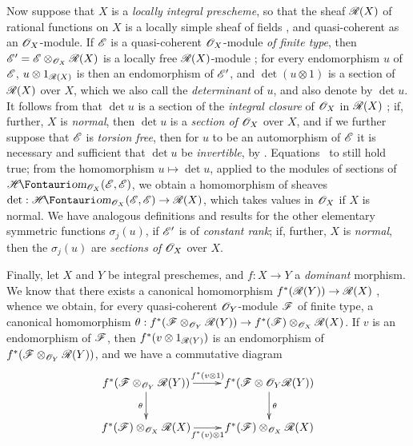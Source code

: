\begin{env}[6.4.9]
Now suppose that $X$ is a \emph{locally integral prescheme}, so that the sheaf $\mathscr{R}(X)$ of rational functions on $X$ is a locally simple sheaf of fields , and quasi-coherent as an $\mathscr{O}_X$-module.
If $\mathscr{E}$ is a quasi-coherent $\mathscr{O}_X$-module \emph{of finite type}, then $\mathscr{E}'=\mathscr{E}\otimes_{\mathscr{O}_X}\mathscr{R}(X)$ is a locally free $\mathscr{R}(X)$-module ;
for every endomorphism $u$ of $\mathscr{E}$, $u\otimes1_{\mathscr{R}(X)}$ is then an endomorphism of $\mathscr{E}'$, and $\det(u\otimes1)$ is a section of $\mathscr{R}(X)$ over $X$, which we also call the \emph{determinant} of $u$, and also denote by $\det u$.
It follows from  that $\det u$ is a section of the \emph{integral closure} of $\mathscr{O}_X$ in $\mathscr{R}(X)$ ;
if, further, $X$ is \emph{normal}, then $\det u$ is a \emph{section of $\mathscr{O}_X$} over $X$, and if we further suppose that $\mathscr{E}$ is \emph{torsion free}, then for $u$ to be an automorphism of $\mathscr{E}$ it is necessary and sufficient that $\det u$ be \emph{invertible}, by .
Equations~ to  still hold true;
from the homomorphism $u\mapsto\det u$, applied to the modules of sections of $\shHom_{\sh{O}_X}(\sh{E},\sh{E})$, we obtain a homomorphism of sheaves $\det:\shHom_{\sh{O}_X}(\sh{E},\sh{E})\to\sh{R}(X)$, which takes values in $\mathscr{O}_X$ if $X$ is normal.
We have analogous definitions and results for the other elementary symmetric functions $\sigma_j(u)$, if $\mathscr{E}'$ is of \emph{constant rank};
if, further, $X$ is \emph{normal}, then the $\sigma_j(u)$ are \emph{sections of $\mathscr{O}_X$} over $X$.

Finally, let $X$ and $Y$ be integral preschemes, and $f:X\to Y$ a \emph{dominant} morphism.
We know that there exists a canonical homomorphism $f^*(\sh{R}(Y))\to\sh{R}(X)$ , whence we obtain, for every quasi-coherent $\mathscr{O}_Y$-module $\mathscr{F}$ of finite type, a canonical homomorphism $\theta:f^*(\sh{F}\otimes_{\sh{O}_Y}\sh{R}(Y))\to f^*(\sh{F})\otimes_{\sh{O}_X}\sh{R}(X)$.
If $v$ is an endomorphism of $\mathscr{F}$, then $f^*(v\otimes1_{\mathscr{R}(Y)})$ is an endomorphism of $f^*(\mathscr{F}\otimes_{\mathscr{O}_Y}\mathscr{R}(Y))$, and we have a commutative diagram
\[
  \xymatrix{
    f^*(\sh{F}\otimes_{\sh{O}_Y}\sh{R}(Y))
      \ar[r]^{f^*(v\otimes1)}
      \ar[d]_{\theta}
    & f^*(\sh{F}\otimes{\sh{O}_Y}\sh{R}(Y))
      \ar[d]^{\theta}
  \\f^*(\sh{F})\otimes_{\sh{O}_X}\sh{R}(X)
      \ar[r]_{f^*(v)\otimes1}
    & f^*(\sh{F})\otimes_{\sh{O}_X}\sh{R}(X)
  }
\]


\end{env}
